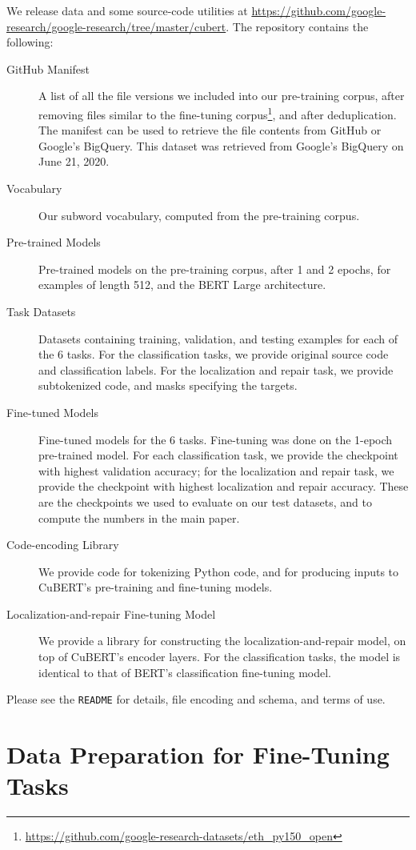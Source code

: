 \documentclass{article}
\newcommand{\BERTforCode}{CuBERT\xspace}
\begin{document}
We release data and some source-code utilities at \url{https://github.com/google-research/google-research/tree/master/cubert}. The repository contains the following:
\begin{description}
    \item[GitHub Manifest] A list of all the file versions we included into our pre-training corpus, after removing files similar to the fine-tuning corpus\footnote{\url{https://github.com/google-research-datasets/eth_py150_open}}, and after deduplication. The manifest can be used to retrieve the file contents from GitHub or Google's BigQuery. This dataset was retrieved from Google's BigQuery on June 21, 2020.
    \item[Vocabulary] Our subword vocabulary, computed from the pre-training corpus.
    \item[Pre-trained Models] Pre-trained models on the pre-training corpus, after 1 and 2 epochs, for examples of length 512, and the BERT Large architecture.
    \item[Task Datasets] Datasets containing training, validation, and testing examples for each of the 6 tasks. For the classification tasks, we provide original source code and classification labels. For the localization and repair task, we provide subtokenized code, and masks specifying the targets.
    \item[Fine-tuned Models] Fine-tuned models for the 6 tasks. Fine-tuning was done on the 1-epoch pre-trained model. For each classification task, we provide the checkpoint with highest validation accuracy; for the localization and repair task, we provide the checkpoint with highest localization and repair accuracy. These are the checkpoints we used to evaluate on our test datasets, and to compute the numbers in the main paper.
    \item[Code-encoding Library] We provide code for tokenizing Python code, and for producing inputs to \BERTforCode{}'s pre-training and fine-tuning models.
    \item[Localization-and-repair Fine-tuning Model] We provide a library for constructing the localization-and-repair model, on top of \BERTforCode{}'s encoder layers. For the classification tasks, the model is identical to that of BERT's classification fine-tuning model.
\end{description}
Please see the \texttt{README} for details, file encoding and schema, and terms of use.


\section{{Data Preparation for Fine-Tuning Tasks}}
\label{sec:data-prep}
\end{document}
